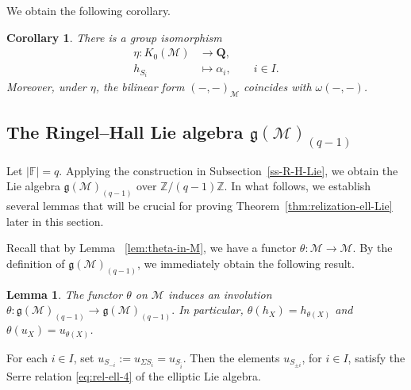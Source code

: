 \documentclass[12pt,reqno]{amsart}
\numberwithin{equation}{section}
\newcommand{\go}{{K_0}}
\newtheorem{corollary}[theorem]{Corollary}
\newtheorem{lemma}[theorem]{Lemma}
\begin{document}
	We obtain the following corollary.
	\begin{corollary}\label{cor:Q=K0(M)}
		There is a group isomorphism
		\begin{align*}
			\eta:\go(\mathcal{M}) &\longrightarrow \mathbf{Q},\\
			h_{S_i} &\longmapsto \alpha_i,\qquad i\in I.
		\end{align*}
		Moreover, under $\eta$, the bilinear form $(-,-)_{\mathcal{M}}$ coincides with $\omega(-,-)$.
	\end{corollary}
	
	
	
	\subsection{The Ringel--Hall Lie algebra $\mathfrak{g}(\mathcal{M})_{(q-1)}$ }
	Let $|\mathbb{F}|=q$. Applying the construction in
	Subsection~\ref{ss-R-H-Lie}, we obtain the Lie algebra
	$\mathfrak{g}(\mathcal{M})_{(q-1)}$ over
	$\mathbb{Z}/(q-1)\mathbb{Z}$. In what follows, we establish several lemmas that will be crucial for proving Theorem~\ref{thm:relization-ell-Lie} later in this section.
	
	Recall that by Lemma ~\ref{lem:theta-in-M}, we have a functor $\theta:\mathcal{M}\rightarrow\mathcal{M}$.
	By the definition of $\mathfrak{g}(\mathcal{M})_{(q - 1)}$, we immediately obtain the following result. 
	
	\begin{lemma}
		The functor $\theta$ on $\mathcal{M}$
		induces an involution
		$\theta:
		\mathfrak{g}(\mathcal{M})_{(q-1)}
		\rightarrow
		\mathfrak{g}(\mathcal{M})_{(q-1)}.$
		In particular,
		$\theta(h_X)=h_{\theta(X)}
		$ and $\theta(u_X)=u_{\theta(X)}$.
	\end{lemma}
	
	
	For each $i\in I$, set $u_{S_{-i}}:=u_{\Sigma S_i}=u_{S_{\bar i}}$. Then the elements $u_{S_{\pm i}}$, for $i\in I$, satisfy the Serre relation \eqref{eq:rel-ell-4} of the elliptic Lie algebra.
	
	
	
\end{document}
